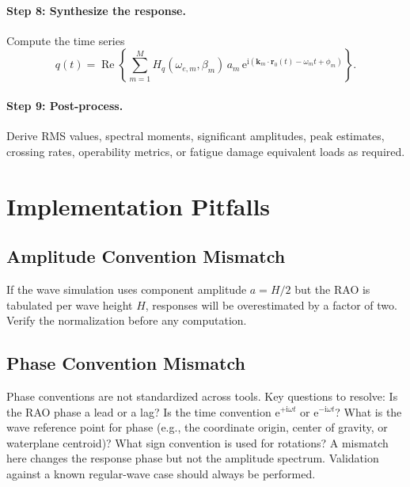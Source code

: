 \documentclass[journal,10pt,twocolumn]{IEEEtran}
\newcommand{\ii}{\mathrm{i}}
\newcommand{\ee}{\mathrm{e}}
\newcommand{\Real}{\operatorname{Re}}
\newcommand{\vect}[1]{\bm{#1}}
\begin{document}
    \paragraph{Step 8: Synthesize the response.}
    Compute the time series
    \begin{equation}
        q(t) = \Real\!\left\{
        \sum_{m=1}^{M}
        H_q(\omega_{e,m},\beta_m)\,a_m\,
        \ee^{\ii(\vect{k}_m\cdot\vect{r}_0(t)-\omega_m t+\phi_m)}
        \right\}.
        \label{eq:final_synthesis}
    \end{equation}

    \paragraph{Step 9: Post-process.}
    Derive RMS values, spectral moments, significant amplitudes, peak estimates, crossing
    rates, operability metrics, or fatigue damage equivalent loads as required.

    \section{Implementation Pitfalls}
    \label{sec:pitfalls}

    \subsection{Amplitude Convention Mismatch}
    \label{sec:amp_mismatch}

    If the wave simulation uses component amplitude $a=H/2$ but the RAO is tabulated per
    wave height $H$, responses will be overestimated by a factor of two.
    Verify the normalization before any computation.

    \subsection{Phase Convention Mismatch}
    \label{sec:phase_mismatch}

    Phase conventions are not standardized across tools.
    Key questions to resolve: Is the RAO phase a lead or a lag? Is the time convention
    $\ee^{+\ii\omega t}$ or $\ee^{-\ii\omega t}$? What is the wave reference point for
    phase (e.g., the coordinate origin, center of gravity, or waterplane centroid)? What
    sign convention is used for rotations?
    A mismatch here changes the response phase but not the amplitude spectrum.
    Validation against a known regular-wave case should always be performed.
\end{document}
